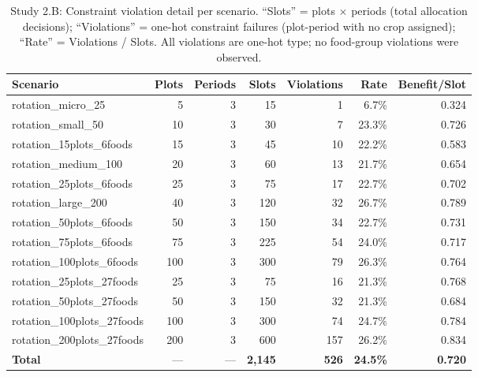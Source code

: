 \documentclass{oqireport}
\begin{document}
\begin{table}[H]
\centering
\caption{Study 2.B: Constraint violation detail per scenario. ``Slots'' = plots $\times$ periods (total allocation decisions); ``Violations'' = one-hot constraint failures (plot-period with no crop assigned); ``Rate'' = Violations / Slots. All violations are one-hot type; no food-group violations were observed.}
\label{tab:study2b_violations_detail}
\small
\begin{adjustbox}{max width=\textwidth}
\begin{tabular}{l r r r r r r}
\toprule
\textbf{Scenario} & \textbf{Plots} & \textbf{Periods} & \textbf{Slots} & \textbf{Violations} & \textbf{Rate} & \textbf{Benefit/Slot} \\
\midrule
rotation\_micro\_25 & 5 & 3 & 15 & 1 & 6.7\% & 0.324 \\
rotation\_small\_50 & 10 & 3 & 30 & 7 & 23.3\% & 0.726 \\
rotation\_15plots\_6foods & 15 & 3 & 45 & 10 & 22.2\% & 0.583 \\
rotation\_medium\_100 & 20 & 3 & 60 & 13 & 21.7\% & 0.654 \\
rotation\_25plots\_6foods & 25 & 3 & 75 & 17 & 22.7\% & 0.702 \\
rotation\_large\_200 & 40 & 3 & 120 & 32 & 26.7\% & 0.789 \\
rotation\_50plots\_6foods & 50 & 3 & 150 & 34 & 22.7\% & 0.731 \\
rotation\_75plots\_6foods & 75 & 3 & 225 & 54 & 24.0\% & 0.717 \\
rotation\_100plots\_6foods & 100 & 3 & 300 & 79 & 26.3\% & 0.764 \\
rotation\_25plots\_27foods & 25 & 3 & 75 & 16 & 21.3\% & 0.768 \\
rotation\_50plots\_27foods & 50 & 3 & 150 & 32 & 21.3\% & 0.684 \\
rotation\_100plots\_27foods & 100 & 3 & 300 & 74 & 24.7\% & 0.784 \\
rotation\_200plots\_27foods & 200 & 3 & 600 & 157 & 26.2\% & 0.834 \\
\midrule
\textbf{Total} & --- & --- & \textbf{2,145} & \textbf{526} & \textbf{24.5\%} & \textbf{0.720} \\
\bottomrule
\end{tabular}
\end{adjustbox}
\end{table}


\end{document}
